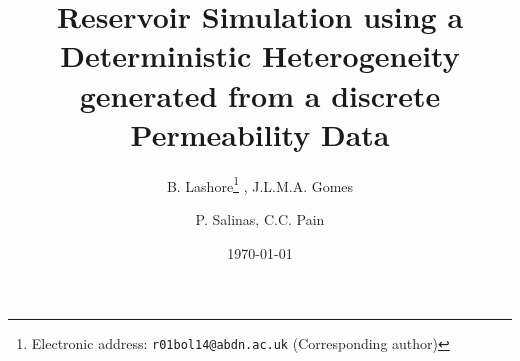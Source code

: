 \documentclass{article}
\begin{document}
\title{Reservoir Simulation using a Deterministic Heterogeneity generated from a discrete Permeability Data}


\author{B. Lashore\thanks{Electronic address: \texttt{r01bol14@abdn.ac.uk} (Corresponding author)} , J.L.M.A. Gomes}

\author{P. Salinas, C.C. Pain}


\date \today
\maketitle
\end{document}
